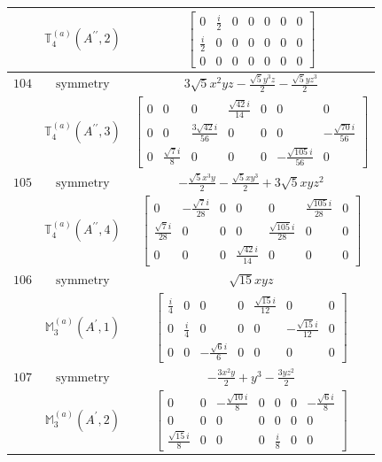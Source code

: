 \documentclass[fleqn,8pt,landscape]{jsarticle}
\begin{document}
\begin{longtable}{ccc}
$  $ & $ \mathbb{T}_{4}^{(a)}(A^{\prime\prime},2) $ & $ \begin{bmatrix} 0 & \frac{i}{2} & 0 & 0 & 0 & 0 & 0 \\ \frac{i}{2} & 0 & 0 & 0 & 0 & 0 & 0 \\ 0 & 0 & 0 & 0 & 0 & 0 & 0 \end{bmatrix} $ \\ \hline
$ 104 $ & $ \text{symmetry} $ & $ 3 \sqrt{5} x^{2} y z - \frac{\sqrt{5} y^{3} z}{2} - \frac{\sqrt{5} y z^{3}}{2} $ \\
$  $ & $ \mathbb{T}_{4}^{(a)}(A^{\prime\prime},3) $ & $ \begin{bmatrix} 0 & 0 & 0 & \frac{\sqrt{42} i}{14} & 0 & 0 & 0 \\ 0 & 0 & \frac{3 \sqrt{42} i}{56} & 0 & 0 & 0 & - \frac{\sqrt{70} i}{56} \\ 0 & \frac{\sqrt{7} i}{8} & 0 & 0 & 0 & - \frac{\sqrt{105} i}{56} & 0 \end{bmatrix} $ \\ \hline
$ 105 $ & $ \text{symmetry} $ & $ - \frac{\sqrt{5} x^{3} y}{2} - \frac{\sqrt{5} x y^{3}}{2} + 3 \sqrt{5} x y z^{2} $ \\
$  $ & $ \mathbb{T}_{4}^{(a)}(A^{\prime\prime},4) $ & $ \begin{bmatrix} 0 & - \frac{\sqrt{7} i}{28} & 0 & 0 & 0 & \frac{\sqrt{105} i}{28} & 0 \\ \frac{\sqrt{7} i}{28} & 0 & 0 & 0 & \frac{\sqrt{105} i}{28} & 0 & 0 \\ 0 & 0 & 0 & \frac{\sqrt{42} i}{14} & 0 & 0 & 0 \end{bmatrix} $ \\ \hline
$ 106 $ & $ \text{symmetry} $ & $ \sqrt{15} x y z $ \\
$  $ & $ \mathbb{M}_{3}^{(a)}(A^{\prime},1) $ & $ \begin{bmatrix} \frac{i}{4} & 0 & 0 & 0 & \frac{\sqrt{15} i}{12} & 0 & 0 \\ 0 & \frac{i}{4} & 0 & 0 & 0 & - \frac{\sqrt{15} i}{12} & 0 \\ 0 & 0 & - \frac{\sqrt{6} i}{6} & 0 & 0 & 0 & 0 \end{bmatrix} $ \\ \hline
$ 107 $ & $ \text{symmetry} $ & $ - \frac{3 x^{2} y}{2} + y^{3} - \frac{3 y z^{2}}{2} $ \\
$  $ & $ \mathbb{M}_{3}^{(a)}(A^{\prime},2) $ & $ \begin{bmatrix} 0 & 0 & - \frac{\sqrt{10} i}{8} & 0 & 0 & 0 & - \frac{\sqrt{6} i}{8} \\ 0 & 0 & 0 & 0 & 0 & 0 & 0 \\ \frac{\sqrt{15} i}{8} & 0 & 0 & 0 & \frac{i}{8} & 0 & 0 \end{bmatrix} $ \\ \hline

\end{longtable}
\end{document}
